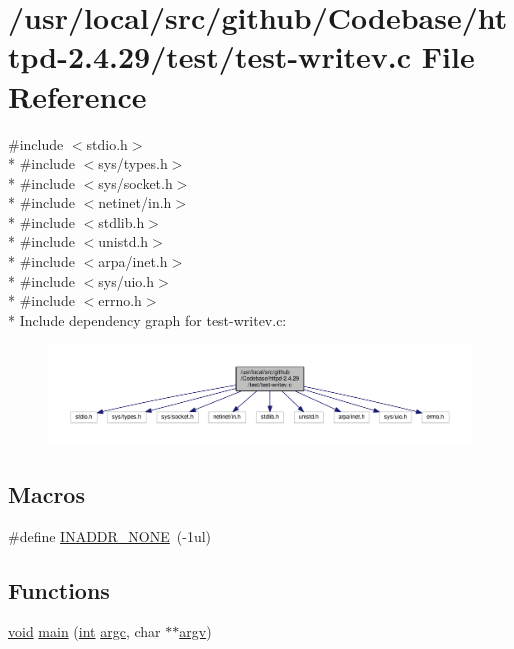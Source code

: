 \hypertarget{test-writev_8c}{}\section{/usr/local/src/github/\+Codebase/httpd-\/2.4.29/test/test-\/writev.c File Reference}
\label{test-writev_8c}
{\ttfamily \#include $<$stdio.\+h$>$}\\*
{\ttfamily \#include $<$sys/types.\+h$>$}\\*
{\ttfamily \#include $<$sys/socket.\+h$>$}\\*
{\ttfamily \#include $<$netinet/in.\+h$>$}\\*
{\ttfamily \#include $<$stdlib.\+h$>$}\\*
{\ttfamily \#include $<$unistd.\+h$>$}\\*
{\ttfamily \#include $<$arpa/inet.\+h$>$}\\*
{\ttfamily \#include $<$sys/uio.\+h$>$}\\*
{\ttfamily \#include $<$errno.\+h$>$}\\*
Include dependency graph for test-\/writev.c\+:
\nopagebreak
\begin{figure}[H]
\begin{center}
\leavevmode
\includegraphics[width=350pt]{test-writev_8c__incl}
\end{center}
\end{figure}
\subsection*{Macros}
\begin{DoxyCompactItemize}
\item 
\#define \hyperlink{test-writev_8c_a3d2472d6cf31b73eeb829110dd0fffea}{I\+N\+A\+D\+D\+R\+\_\+\+N\+O\+NE}~(-\/1ul)
\end{DoxyCompactItemize}
\subsection*{Functions}
\begin{DoxyCompactItemize}
\item 
\hyperlink{group__MOD__ISAPI_gacd6cdbf73df3d9eed42fa493d9b621a6}{void} \hyperlink{test-writev_8c_a70db8bd1d499619f7ff9c1ca2ff3c8df}{main} (\hyperlink{pcre_8txt_a42dfa4ff673c82d8efe7144098fbc198}{int} \hyperlink{group__apr__getopt_ga6bdebf9385dc069c90aa21989641be02}{argc}, char $\ast$$\ast$\hyperlink{group__apr__getopt_ga675a108e956f4e2ea74dae8d26e6273e}{argv})
\end{DoxyCompactItemize}


